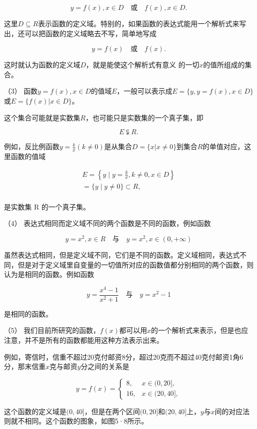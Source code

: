 \[
y = f (x), x \in D \quad \text{或} \quad f (x), x \in D.
\]

这里\(D \subseteq R\)表示函数的定义域。特别的，如果函数的表达式能用一个解析式来写出，还可以把函数的定义域略去不写，简单地写成

\[
y = f (x) \quad \text{或} \quad f (x).
\]

这时就认为函数的定义域\(D\)，就是能使这个解析式有意义
的一切\(x\)的值所组成的集合。

（3）
函数\(y = f(x), x \in D\)的值域\(E\)，一般可以表示成\(E = \{y, y = f(x), x \in D\}\)或\(E = \{f(x) | x \in D\}\)。

这个集合可能就是实数集\(R\)，也可能只是实数集的一个真子集，即

\[
E \subsetneqq R.
\]

例如，反比例函数\(y = \frac{k}{x} (k \neq 0)\)是从集合\(D = \{x | x \neq 0\}\)到集合\(R\)的单值对应，这里函数的值域

\[
\begin{array}{l} E = \left\{y \mid y = \frac{k}{x}, k \neq 0, x \in D \right\} \\ = \{y \mid y \neq 0 \} \subset R, \\ \end{array}
\]

是实数集 R 的一个真子集。

（4） 表达式相同而定义域不同的两个函数是不同的函数，例如函数

\[
y = x^{2}, x \in R \quad \text{与} \quad y = x^{2}, x \in (0, + \infty)
\]

虽然表达式相同，但是定义域不同，它们是不同的函数。定义域相同，表达式不同，但是对于定义域里自变量的一切值所对应的函数值都分别相同的两个函数，则认为是相同的函数。例如函数

\[
y = \frac{x^{4} - 1}{x^{2} + 1} \quad \text{与} \quad y = x^{2} - 1
\]

是相同的函数。

（5）
我们目前所研究的函数，\(f(x)\)都可以用\(x\)的一个解析式来表示，但是也应注意，并不是所有的函数都能用这种方法表示出来。

例如，寄信时，信重不超过20克付邮资8分，超过20克而不超过40克付邮资1角6分，那末信重\(x\)克与邮资\(y\)分之间的关系是

\[
y = f (x) = \left\{ \begin{array}{ll} 8, & x \in (0, 20 ], \\ 16, & x \in (20, 40 ], \end{array} \right.
\]

这个函数的定义域是\((0, 40]\)，但是在两个区间\((0, 20]\)和\((20, 40]\)上，\(y\)与\(x\)间的对应法则就不相同。这个函数的图象，如图5·8所示。

